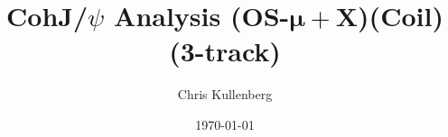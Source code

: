 \title{CohJ/$\psi$ Analysis (\textbf{OS}-$\boldsymbol{\mu+}$\textbf{X})(\textbf{Coil})(\textbf{3-track})}
\author{Chris Kullenberg}
\date{\today}
